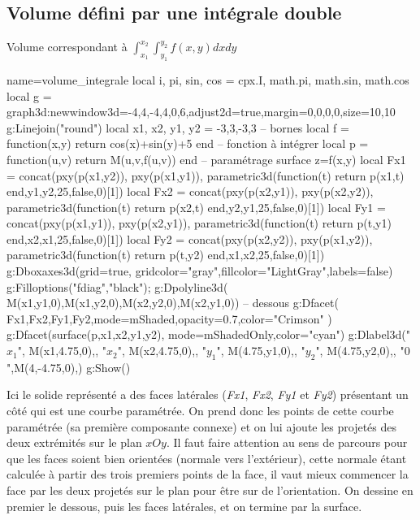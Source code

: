 \subsection{Volume défini par une intégrale double}
\begin{demo}{Volume correspondant à $\int_{x_1}^{x_2}\int_{y_1}^{y_2}f(x,y)dxdy$}
\begin{luadraw}{name=volume_integrale}
local i, pi, sin, cos = cpx.I, math.pi, math.sin, math.cos
local g = graph3d:new{window3d={-4,4,-4,4,0,6},adjust2d=true,margin={0,0,0,0},size={10,10}}
g:Linejoin("round")
local x1, x2, y1, y2 = -3,3,-3,3 -- bornes
local f = function(x,y) return cos(x)+sin(y)+5 end -- fonction à intégrer
local p = function(u,v) return M(u,v,f(u,v)) end -- paramétrage surface z=f(x,y)
local Fx1 = concat({pxy(p(x1,y2)), pxy(p(x1,y1))}, parametric3d(function(t) return p(x1,t) end,y1,y2,25,false,0)[1])
local Fx2 = concat({pxy(p(x2,y1)), pxy(p(x2,y2))}, parametric3d(function(t) return p(x2,t) end,y2,y1,25,false,0)[1])
local Fy1 = concat({pxy(p(x1,y1)), pxy(p(x2,y1))}, parametric3d(function(t) return p(t,y1) end,x2,x1,25,false,0)[1])
local Fy2 = concat({pxy(p(x2,y2)), pxy(p(x1,y2))}, parametric3d(function(t) return p(t,y2) end,x1,x2,25,false,0)[1])
g:Dboxaxes3d({grid=true, gridcolor="gray",fillcolor="LightGray",labels=false})
g:Filloptions("fdiag","black"); g:Dpolyline3d( {M(x1,y1,0),M(x1,y2,0),M(x2,y2,0),M(x2,y1,0)}) -- dessous
g:Dfacet( {Fx1,Fx2,Fy1,Fy2},{mode=mShaded,opacity=0.7,color="Crimson"} )
g:Dfacet(surface(p,x1,x2,y1,y2), {mode=mShadedOnly,color="cyan"})
g:Dlabel3d("$x_1$", M(x1,4.75,0),{}, "$x_2$", M(x2,4.75,0),{}, "$y_1$", M(4.75,y1,0),{}, "$y_2$", M(4.75,y2,0),{}, "$0$",M(4,-4.75,0),{})  
g:Show()  
\end{luadraw}
\end{demo}

Ici le solide représenté a des faces latérales (\emph{Fx1}, \emph{Fx2}, \emph{Fy1} et \emph{Fy2}) présentant un côté qui est une courbe paramétrée. On prend donc les points de cette courbe paramétrée (sa première composante connexe) et on lui ajoute les projetés des deux extrémités sur le plan $xOy$. Il faut faire attention au sens de parcours pour que les faces soient bien orientées (normale vers l'extérieur), cette normale étant calculée à partir des trois premiers points de la face, il vaut mieux commencer la face par les deux projetés sur le plan pour être sur de l'orientation.
On dessine en premier le dessous, puis les faces latérales, et on termine par la surface.


